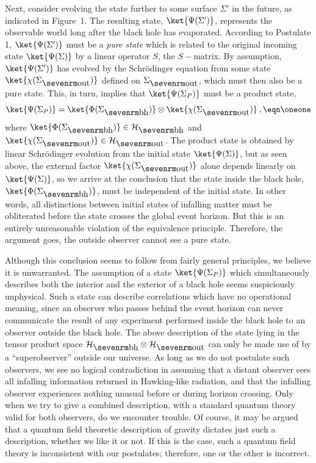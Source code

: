 Next, consider evolving the state further to some surface $\Sigma'$
in the
future, as indicated in Figure~1.  The resulting state,
$\ket{\Psi(\Sigma')}$, represents the observable world long after the
black hole has evaporated.  According to Postulate 1,
$\ket{\Psi(\Sigma')}$ must be a {\it pure state} which is related to
the original incoming state $\ket{\Psi(\Sigma)}$ by a linear operator
$S$, the $S-$matrix.  By assumption, $\ket{\Psi(\Sigma')}$ has
evolved by the Schr\"odinger equation from some state
$\ket{\chi(\Sigma_{\out})}$ defined on $\Sigma_{\out}$, which must
then also be a pure state.  This, in turn, implies that
$\ket{\Psi(\Sigma_P)}$ must be a product state,
$$
\ket{\Psi(\Sigma_P)} = \ket{\Phi(\Sigma_{\BH})} \otimes
\ket{\chi(\Sigma_{\out})} \>,
\eqn\oneone
$$
where $\ket{\Phi(\Sigma_{\BH})} \in {\cal H}_{\BH}$ and
$\ket{\chi(\Sigma_{\out})} \in {\cal H}_{\out}$.  The product state
is obtained by linear Schr\"odinger evolution from the initial state
$\ket{\Psi(\Sigma)}$, but as seen above, the external factor
$\ket{\chi(\Sigma_{\out})}$ alone depends linearly on
$\ket{\Psi(\Sigma)}$, so we arrive at the conclusion that the state
inside the black hole, $\ket{\Phi(\Sigma_{\BH})}$, must be
independent of the initial state.  In other words, all distinctions
between initial states of infalling matter must be obliterated before
the state crosses the global event horizon. But this is an entirely
unreasonable violation of the equivalence principle. Therefore, the
argument goes, the outside observer cannot see a pure state.

Although this conclusion seems to follow from fairly general
principles, we believe it is unwarranted.  The assumption of a state
$\ket{\Psi(\Sigma_P)}$ which simultaneously describes both the
interior and the exterior of a black hole seems suspiciously
unphysical.  Such a state can describe correlations which have no
operational meaning, since an observer who passes behind the event
horizon can never communicate the result of any experiment performed
inside the black hole to an observer outside the black hole.  The
above description of the state lying in the tensor product space
${\cal H}_{\BH} \otimes {\cal H}_{\out}$ can only be made use of by a
``superobserver'' outside our universe.  As long as we do not
postulate such observers, we see no logical contradiction in assuming
that a distant observer sees all infalling information returned in
Hawking-like radiation, and that the infalling observer experiences
nothing unusual before or during horizon crossing. Only when we try
to give a combined description, with a standard quantum theory valid
for both observers, do we encounter trouble.  Of course, it may be
argued that a quantum field theoretic description of gravity dictates
just such a description, whether we like it or not.  If this is the
case, such a quantum field theory is inconsistent with our
postulates; therefore, one or the other is incorrect.

